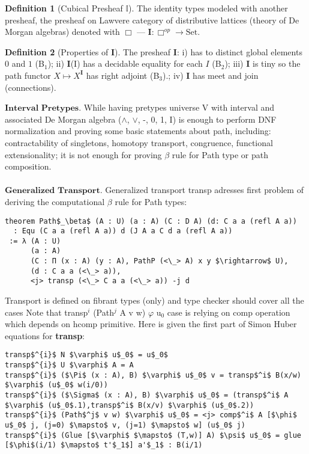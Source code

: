 \documentclass{article}
\theoremstyle{definition}
\newtheorem{definition}{Definition}
\begin{document}
\begin{definition}[Cubical Presheaf $\mathbb{I}$]
The identity types modeled with another presheaf, the presheaf on Lawvere
category of distributive lattices (theory of De Morgan algebras) denoted
with $\Box$ — $\textbf{I} : \Box^{op} \rightarrow \textrm{Set}$.
\end{definition}

\begin{definition}[Properties of $\textbf{I}$] The presheaf $\textbf{I}$:
i) has to distinct global elements $0$ and $1$ (B$_1$);
ii) $\textbf{I}$(I) has a decidable equality for each $I$ (B$_2$);
iii) $\textbf{I}$ is tiny so the path functor $X \mapsto X^\textbf{I}$ has right adjoint (B$_3$).;
iv) $\textbf{I}$ has meet and join (connections).
\end{definition}

$\textbf{Interval\ Pretypes}$. While having pretypes universe V with interval and
associated De Morgan algebra ($\wedge$, $\vee$, -, 0, 1, I) is enough to
perform DNF normalization and proving some basic statements about path, including:
contractability of singletons, homotopy transport, congruence, functional
extensionality; it is not enough for proving $\beta$ rule for Path type or path composition.
\\
\\
\indent $\textbf{Generalized\ Transport}$. Generalized transport transp adresses
first problem of deriving the computational $\beta$ rule for Path types:

\begin{lstlisting}[mathescape=true]
theorem Path$_\beta$ (A : U) (a : A) (C : D A) (d: C a a (refl A a))
  : Equ (C a a (refl A a)) d (J A a C d a (refl A a))
 := λ (A : U)
      (a : A)
      (C : П (x : A) (y : A), PathP (<\_> A) x y $\rightarrow$ U),
      (d : C a a (<\_> a)),
      <j> transp (<\_> C a a (<\_> a)) -j d
\end{lstlisting}

Transport is defined on fibrant types (only) and type checker should cover all the cases
Note that transp$^i$ (Path$^j$ A v w) $\varphi$ u$_0$ case is relying on comp
operation which depends on hcomp primitive. Here is given the first part of Simon Huber equations \cite{Huber} for \textbf{transp}:

\begin{lstlisting}[mathescape=true]
transp$^{i}$ N $\varphi$ u$_0$ = u$_0$
transp$^{i}$ U $\varphi$ A = A
transp$^{i}$ ($\Pi$ (x : A), B) $\varphi$ u$_0$ v = transp$^i$ B(x/w) $\varphi$ (u$_0$ w(i/0))
transp$^{i}$ ($\Sigma$ (x : A), B) $\varphi$ u$_0$ = (transp$^i$ A $\varphi$ (u$_0$.1),transp$^i$ B(x/v) $\varphi$ (u$_0$.2))
transp$^{i}$ (Path$^j$ v w) $\varphi$ u$_0$ = <j> comp$^i$ A [$\phi$ u$_0$ j, (j=0) $\mapsto$ v, (j=1) $\mapsto$ w] (u$_0$ j)
transp$^{i}$ (Glue [$\varphi$ $\mapsto$ (T,w)] A) $\psi$ u$_0$ = glue [$\phi$(i/1) $\mapsto$ t'$_1$] a'$_1$ : B(i/1)
\end{lstlisting}
\end{document}
